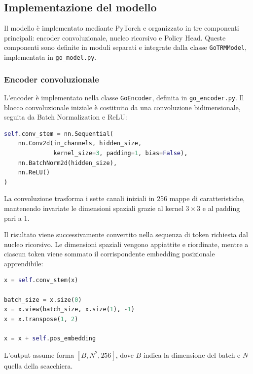 \subsection{Implementazione del modello}

Il modello è implementato mediante PyTorch e organizzato in tre componenti principali: encoder convoluzionale, nucleo ricorsivo e Policy Head. Queste componenti sono definite in moduli separati e integrate dalla classe \texttt{GoTRMModel}, implementata in \texttt{go\_model.py}.

\subsubsection{Encoder convoluzionale}

L'encoder è implementato nella classe \texttt{GoEncoder}, definita in \texttt{go\_encoder.py}. Il blocco convoluzionale iniziale è costituito da una convoluzione bidimensionale, seguita da Batch Normalization e ReLU:

\begin{lstlisting}[language=Python, caption={Definizione del blocco convoluzionale di GoEncoder}, label={lst:go_encoder}]
self.conv_stem = nn.Sequential(
    nn.Conv2d(in_channels, hidden_size,
              kernel_size=3, padding=1, bias=False),
    nn.BatchNorm2d(hidden_size),
    nn.ReLU()
)
\end{lstlisting}

La convoluzione trasforma i sette canali iniziali in 256 mappe di caratteristiche, mantenendo invariate le dimensioni spaziali grazie al kernel \(3\times3\) e al padding pari a 1.

Il risultato viene successivamente convertito nella sequenza di token richiesta dal nucleo ricorsivo. Le dimensioni spaziali vengono appiattite e riordinate, mentre a ciascun token viene sommato il corrispondente embedding posizionale apprendibile:

\begin{lstlisting}[language=Python, caption={Conversione delle mappe convoluzionali in una sequenza}, label={lst:go_encoder_sequence}]
x = self.conv_stem(x)

batch_size = x.size(0)
x = x.view(batch_size, x.size(1), -1)
x = x.transpose(1, 2)

x = x + self.pos_embedding
\end{lstlisting}

L'output assume forma \([B,N^2,256]\), dove \(B\) indica la dimensione del batch e \(N\) quella della scacchiera.

